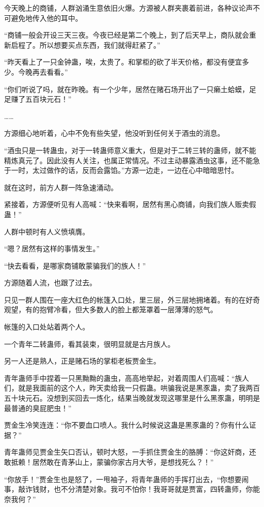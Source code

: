 \begin{this_body}
今天晚上的商铺，人群汹涌生意依旧火爆。方源被人群夹裹着前进，各种议论声不可避免地传入他的耳中。

“商铺一般会开设三天三夜。今夜已经是第二个晚上，到了后天早上，商队就会重新启程了。所以想要买点东西，我们就得赶紧了。”

“昨天看上了一只金钟蛊，唉，太贵了。和掌柜的砍了半天价格，都没有便宜多少。今晚再去看看。”

“你们听说了吗，就在昨晚。有一个少年，居然在赌石场开出了一只癞土蛤蟆，足足赚了五百块元石！”

……

方源细心地听着，心中不免有些失望，他没听到任何关于酒虫的消息。

“酒虫只是一转蛊虫，对于一转蛊师意义重大，但是对于二转三转的蛊师，就不能精炼真元了。因此没有人关注，也属正常情况。不过主动暴露酒虫这事，还不能急于一时，太过做作的话，反而会露馅。”方源一边走，一边在心中暗暗思忖。

就在这时，前方人群一阵急速涌动。

紧接着，方源便听见有人高喊：“快来看啊，居然有黑心商铺，向我们族人贩卖假蛊！”

人群中顿时有人义愤填膺。

“嗯？居然有这样的事情发生。”

“快去看看，是哪家商铺敢蒙骗我们的族人！”

方源随着人流，也跟了过去。

只见一群人围在一座大红色的帐篷入口处，里三层，外三层地拥堵着。有的在好奇观望，有的抱臂冷看，但大多数人的脸上都笼罩着一层薄薄的怒气。

帐篷的入口处站着两个人。

一个青年二转蛊师，看其装束，很明显就是古月族人。

另一人还是熟人，正是赌石场的掌柜老板贾金生。

青年蛊师手中捏着一只黑黝黝的蛊虫，高高地举起，对着周围人们高喊：“族人们，就是我面前的这个人，昨天卖给我一只假蛊。哄骗我说是黑豕蛊，卖了我两百五十块元石。没想到买回去一炼化，结果当晚就发现这哪里是什么黑豕蛊，明明是最普通的臭屁肥虫！”

贾金生冷笑连连：“你不要血口喷人。我什么时候说这蛊是黑豕蛊的？你有什么证据？”

青年蛊师见贾金生矢口否认，顿时大怒，一手抓住贾金生的胳膊：“你这奸商，还敢抵赖！居然敢在青茅山上，蒙骗你家古月大爷，是想找死么？！”

“你放手！”贾金生也是怒了，一甩袖子，将青年蛊师的手挥打出去，“你想要闹事，敲诈钱财，也不分清楚对象。我可不怕你！我哥哥就是贾富，四转蛊师，你能奈我何？”


\end{this_body}
